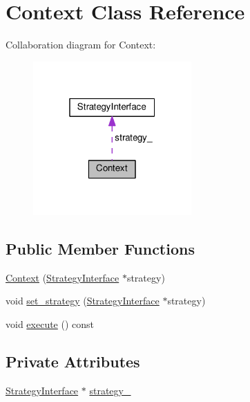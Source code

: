 \hypertarget{classContext}{}\section{Context Class Reference}
\label{classContext}


Collaboration diagram for Context\+:
\nopagebreak
\begin{figure}[H]
\begin{center}
\leavevmode
\includegraphics[width=172pt]{classContext__coll__graph}
\end{center}
\end{figure}
\subsection*{Public Member Functions}
\begin{DoxyCompactItemize}
\item 
\hyperlink{classContext_a4a38a1bd4ea50da0c91d8e5335467156}{Context} (\hyperlink{classStrategyInterface}{Strategy\+Interface} $\ast$strategy)
\item 
void \hyperlink{classContext_aac5a580be500769aac21a0d0a92ee902}{set\+\_\+strategy} (\hyperlink{classStrategyInterface}{Strategy\+Interface} $\ast$strategy)
\item 
void \hyperlink{classContext_a0f1e35fbff90abf753c54fbe5914805f}{execute} () const 
\end{DoxyCompactItemize}
\subsection*{Private Attributes}
\begin{DoxyCompactItemize}
\item 
\hyperlink{classStrategyInterface}{Strategy\+Interface} $\ast$ \hyperlink{classContext_afbfabe689b09b6558cd8b40c25a7d04b}{strategy\+\_\+}
\end{DoxyCompactItemize}


